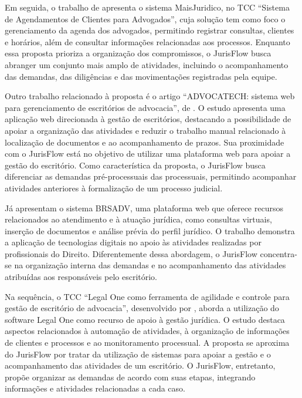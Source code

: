 Em seguida, o trabalho de  apresenta o sistema MaisJuridico, no TCC ``Sistema de Agendamentos de Clientes para Advogados'', cuja solução tem como foco o gerenciamento da agenda dos advogados, permitindo registrar consultas, clientes e horários, além de consultar informações relacionadas aos processos. Enquanto essa proposta prioriza a organização dos compromissos, o JurisFlow busca abranger um conjunto mais amplo de atividades, incluindo o acompanhamento das demandas, das diligências e das movimentações registradas pela equipe.

Outro trabalho relacionado à proposta é o artigo ``ADVOCATECH: sistema web para gerenciamento de escritórios de advocacia'', de . O estudo apresenta uma aplicação web direcionada à gestão de escritórios, destacando a possibilidade de apoiar a organização das atividades e reduzir o trabalho manual relacionado à localização de documentos e ao acompanhamento de prazos. Sua proximidade com o JurisFlow está no objetivo de utilizar uma plataforma web para apoiar a gestão do escritório. Como característica da proposta, o JurisFlow busca diferenciar as demandas pré-processuais das processuais, permitindo acompanhar atividades anteriores à formalização de um processo judicial.

Já  apresentam o sistema BRSADV, uma plataforma web que oferece recursos relacionados ao atendimento e à atuação jurídica, como consultas virtuais, inserção de documentos e análise prévia do perfil jurídico. O trabalho demonstra a aplicação de tecnologias digitais no apoio às atividades realizadas por profissionais do Direito. Diferentemente dessa abordagem, o JurisFlow concentra-se na organização interna das demandas e no acompanhamento das atividades atribuídas aos responsáveis pelo escritório.

Na sequência, o TCC ``Legal One como ferramenta de agilidade e controle para gestão de escritório de advocacia'', desenvolvido por , aborda a utilização do software Legal One como recurso de apoio à gestão jurídica. O estudo destaca aspectos relacionados à automação de atividades, à organização de informações de clientes e processos e ao monitoramento processual. A proposta se aproxima do JurisFlow por tratar da utilização de sistemas para apoiar a gestão e o acompanhamento das atividades de um escritório. O JurisFlow, entretanto, propõe organizar as demandas de acordo com suas etapas, integrando informações e atividades relacionadas a cada caso.

